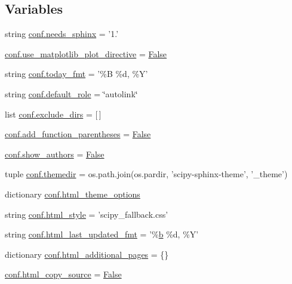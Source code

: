 \subsection*{Variables}
\begin{DoxyCompactItemize}
\item 
string \hyperlink{namespaceconf_a1bd7b8b2b5162016a408465167765e68}{conf.\+needs\+\_\+sphinx} = '1.'
\item 
\hyperlink{namespaceconf_a5f8d625775786514c1bd1cd7a6650d69}{conf.\+use\+\_\+matplotlib\+\_\+plot\+\_\+directive} = \hyperlink{libqhull_8h_a306ebd41c0cd1303b1372c6153f0caf8}{False}
\item 
string \hyperlink{namespaceconf_a17aebe18c0db0c8d1c4017c0b563c934}{conf.\+today\+\_\+fmt} = '\%B \%d, \%Y'
\item 
string \hyperlink{namespaceconf_a038ead0be6737e911aede67886fcedca}{conf.\+default\+\_\+role} = \char`\"{}autolink\char`\"{}
\item 
list \hyperlink{namespaceconf_a423709e8d7f8b9c3b34e88e40550e8ba}{conf.\+exclude\+\_\+dirs} = \mbox{[}$\,$\mbox{]}
\item 
\hyperlink{namespaceconf_a07e256fcb9def824191175f2baa72f60}{conf.\+add\+\_\+function\+\_\+parentheses} = \hyperlink{libqhull_8h_a306ebd41c0cd1303b1372c6153f0caf8}{False}
\item 
\hyperlink{namespaceconf_a8ad36ea49cb7ae6ec9f6f3a7e9deaa0e}{conf.\+show\+\_\+authors} = \hyperlink{libqhull_8h_a306ebd41c0cd1303b1372c6153f0caf8}{False}
\item 
tuple \hyperlink{namespaceconf_a3982c0155434954df650226c6d832521}{conf.\+themedir} = os.\+path.\+join(os.\+pardir, 'scipy-\/sphinx-\/theme', '\+\_\+theme')
\item 
dictionary \hyperlink{namespaceconf_a59fb37ca5915e18823f5f433129b35ec}{conf.\+html\+\_\+theme\+\_\+options}
\item 
string \hyperlink{namespaceconf_a5622a8722272baed29b41d8771ecbe3c}{conf.\+html\+\_\+style} = 'scipy\+\_\+fallback.\+css'
\item 
string \hyperlink{namespaceconf_a65371021a0b434251045fdb650f90b87}{conf.\+html\+\_\+last\+\_\+updated\+\_\+fmt} = '\%\hyperlink{gen__mat5files_8m_a7b38767b3b6a8dae167e5afa4fc340b0}{b} \%d, \%Y'
\item 
dictionary \hyperlink{namespaceconf_a3829515111ba6a7fd25627567430b0e5}{conf.\+html\+\_\+additional\+\_\+pages} = \{\}
\item 
\hyperlink{namespaceconf_a771fe07e57b9dde77561c2dcb1f16204}{conf.\+html\+\_\+copy\+\_\+source} = \hyperlink{libqhull_8h_a306ebd41c0cd1303b1372c6153f0caf8}{False}

\end{DoxyCompactItemize}
